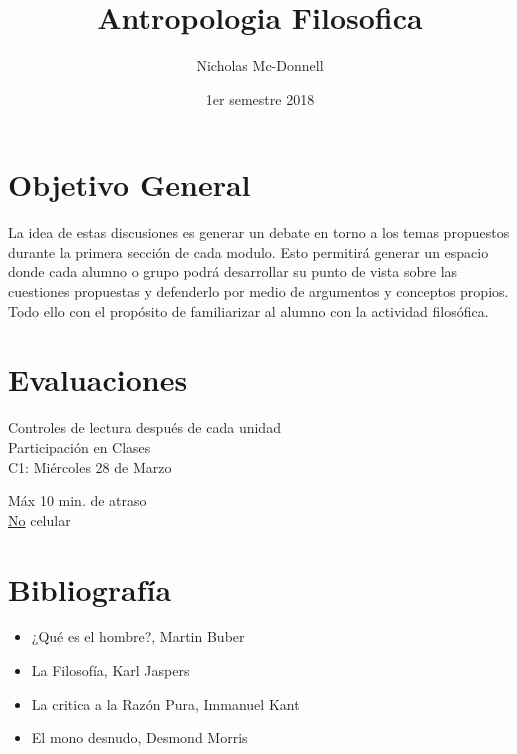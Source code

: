 

\title{Antropologia Filosofica}
\author{Nicholas Mc-Donnell}
\date{1er semestre 2018}



    \maketitle

    \section*{Objetivo General}
    La idea de estas discusiones es generar un debate en torno a los temas propuestos durante la primera sección de cada modulo. Esto permitirá generar un espacio donde cada alumno o grupo podrá desarrollar su punto de vista sobre las cuestiones propuestas y defenderlo por medio de argumentos y conceptos propios. Todo ello con el propósito de familiarizar al alumno con la actividad filosófica.

    \section*{Evaluaciones}
    { Controles de lectura después de cada unidad}\\
    Participación en Clases\\
    C1: Miércoles 28 de Marzo

    \begin{obs}
        Máx 10 min. de atraso\\
        \underline{No} celular
    \end{obs}

    \section*{Bibliografía}
    \begin{itemize}
        \item ¿Qué es el hombre?, Martin Buber

        \item La Filosofía, Karl Jaspers
        
        \item La critica a la Razón Pura, Immanuel Kant

        \item El mono desnudo, Desmond Morris
    \end{itemize}
    \newpage

